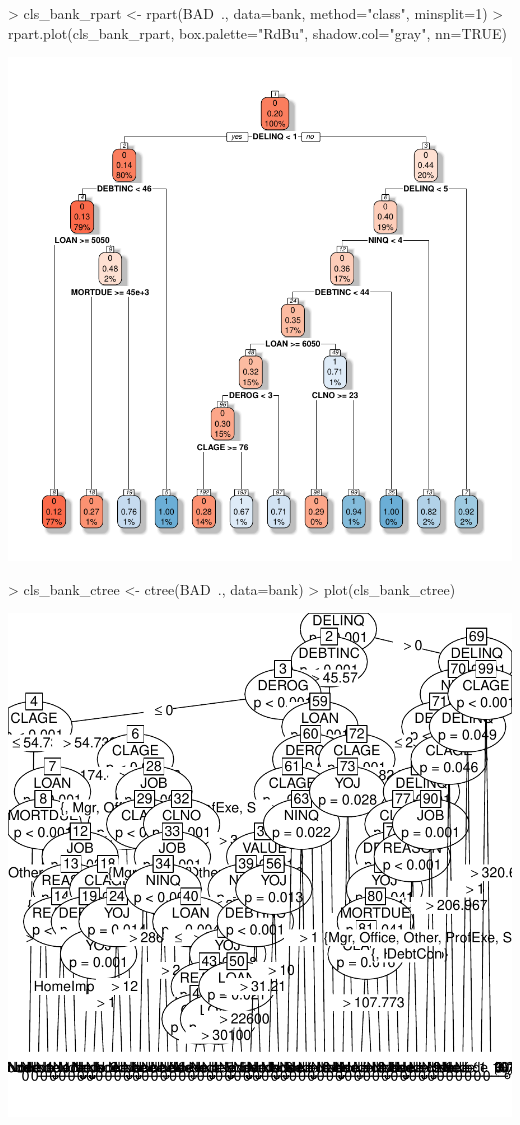 \documentclass [a4paper] {article}
\begin{document}
\begin{center}
\begin{Schunk}
\begin{Sinput}
> cls_bank_rpart <- rpart(BAD~., data=bank, method="class", minsplit=1)
> rpart.plot(cls_bank_rpart, box.palette="RdBu", shadow.col="gray", nn=TRUE)
\end{Sinput}
\end{Schunk}
\includegraphics{entrega-analisis_banco_rpart}
\begin{Schunk}
\begin{Sinput}
> cls_bank_ctree <- ctree(BAD~., data=bank)
> plot(cls_bank_ctree)
\end{Sinput}
\end{Schunk}
\includegraphics{entrega-analisis_banco_ctree}
\end{center}
\end{document}
